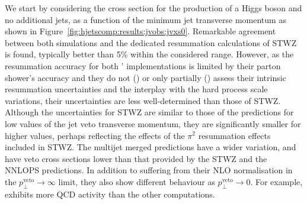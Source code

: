 We start by considering 
the cross section for the production of a Higgs boson and no 
additional jets, as a function of the minimum jet transverse momentum 
as shown in Figure~\ref{fig:hjetscomp:results:jvobs:jvxs0}. Remarkable 
agreement between both \NNLOPS simulations and the dedicated resummation 
calculations of STWZ is found, typically better than 5\% within the considered range. 
However, as the resummation accuracy for both \NNLOPS' implementations is limited by their parton 
shower's accuracy and they do not (\Powheg) or only partially (\Sherpa) 
assess their intrinsic resummation uncertainties and the interplay with the hard process 
scale variations, their uncertainties are less well-determined than those of STWZ. Although
the uncertainties for STWZ are similar to those of the \NNLOPS predictions for low values of the
jet veto transverse momentum, they are significantly smaller for higher values, perhaps reflecting the
effects of the $\pi^2$ resummation effects included in STWZ.
 The multijet merged predictions have a wider variation, and have veto cross sections lower than
that provided by the STWZ and the NNLOPS predictions. In addition to 
suffering from their NLO normalisation in the $p_\perp^\text{veto}\to\infty$ 
limit, they also show different behaviour as $p_\perp^\text{veto}\to 0$. For example, 
\Sherpa \MEPSatNLO exhibits more QCD activity than the other computations. 

